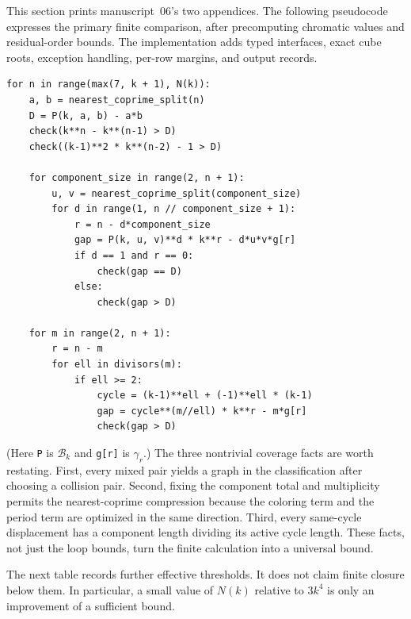 \documentclass[11pt,a4paper]{article}
\numberwithin{equation}{section}
\theoremstyle{definition}
\theoremstyle{remark}
\newcommand{\Bip}{\mathcal B}
\begin{document}
This section prints manuscript~06's two appendices. The following pseudocode
expresses the primary finite comparison, after precomputing chromatic values
and residual-order bounds. The implementation adds typed interfaces, exact
cube roots, exception handling, per-row margins, and output records.

\begin{lstlisting}
for n in range(max(7, k + 1), N(k)):
    a, b = nearest_coprime_split(n)
    D = P(k, a, b) - a*b
    check(k**n - k**(n-1) > D)
    check((k-1)**2 * k**(n-2) - 1 > D)

    for component_size in range(2, n + 1):
        u, v = nearest_coprime_split(component_size)
        for d in range(1, n // component_size + 1):
            r = n - d*component_size
            gap = P(k, u, v)**d * k**r - d*u*v*g[r]
            if d == 1 and r == 0:
                check(gap == D)
            else:
                check(gap > D)

    for m in range(2, n + 1):
        r = n - m
        for ell in divisors(m):
            if ell >= 2:
                cycle = (k-1)**ell + (-1)**ell * (k-1)
                gap = cycle**(m//ell) * k**r - m*g[r]
                check(gap > D)
\end{lstlisting}
(Here \texttt{P} is $\Bip_k$ and \texttt{g[r]} is $\gamma_r$.) The three
nontrivial coverage facts are worth restating. First, every mixed pair yields
a graph in the classification after choosing a collision pair. Second, fixing
the component total and multiplicity permits the nearest-coprime compression
because the coloring term and the period term are optimized in the same
direction. Third, every same-cycle displacement has a component length
dividing its active cycle length. These facts, not just the loop bounds, turn
the finite calculation into a universal bound.

The next table records further effective thresholds. It does not claim finite
closure below them. In particular, a small value of $N(k)$ relative to $3k^4$
is only an improvement of a sufficient bound.
\end{document}
